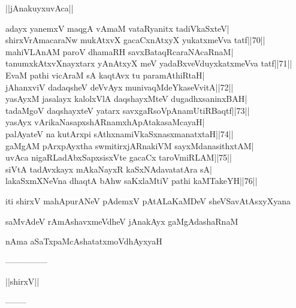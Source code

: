\documentclass{article}
\begin{document}
\begin{center}
||jAnakuyxuvAca||
\end{center}

adayx yanemxV maqgA vAmaM vataRyanitx tadiVkaSxteV|\\
shirxVrAmacaraNw mukAtxvX gacaCxnAtxyX yukatxmeVva tatf||70||\\
mahiVLAnAM paroV dhamaRH savxBataqRcaraNAcaRnaM|\\
tanumxkAtxvXnayxtarx yAnAtxyX meV yadaBxveVduyxkatxmeVva tatf||71||\\
EvaM pathi vicAraM sA kaqtAvx tu paramAthiRtaH|\\
jAhanxviV dadaqsheV deVvAyx munivaqMdeYkaseVvitA||72||\\
yasAyxM jasalayx kalolxVlA daqshayxMteV dugadhxsaninxBAH|\\
tadaMgoV daqshayxteV yatarx savxgaRsoVpAnamUtiRBaqtf||73||\\
yasAyx vArikaNasapxshARnamxhApAtakasaMcayaH|\\
palAyateV na kutArxpi sAthxnamiVkaSxnasxmanatxtaH||74||\\
gaMgAM pArxpAyxtha swmitirxjARnakiVM sayxMdanasithxtAM|\\
uvAca nigaRLadAbxSapxsisxVte gacaCx taroVmiRLAM||75||\\
siVtA tadAvxkayx mAkaNayxR kaSxNAdavatatAra sA|\\
lakaSxmXNeVna dhaqtA bAhw saKxlaMtiV pathi kaMTakeYH||76||

\begin{center}
iti shirxV mahApurANeV pAdemxV pAtALaKaMDeV sheVSavAtAsxyXyana
\end{center}

\begin{center}
saMvAdeV rAmAshavxmeVdheV jAnakAyx gaMgAdashaRnaM
\end{center}

\begin{center}
nAma aSaTxpaMcAshatatxmoVdhAyxyaH
\end{center}

\begin{center}
---------------
\end{center}

\begin{center}
||shirxV||
\end{center}

\begin{center}
--------
\end{center}
\end{document}
